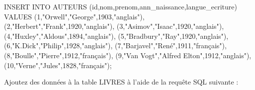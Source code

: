 \documentclass[
  a4paper,
  DIV=11,
  numbers=noendperiod]{scrartcl}
\newenvironment{Shaded}{\begin{snugshade}}{\end{snugshade}}
\newcommand{\DecValTok}[1]{\textcolor[rgb]{0.68,0.00,0.00}{#1}}
\newcommand{\KeywordTok}[1]{\textcolor[rgb]{0.00,0.23,0.31}{#1}}
\newcommand{\NormalTok}[1]{\textcolor[rgb]{0.00,0.23,0.31}{#1}}
\newcommand{\OtherTok}[1]{\textcolor[rgb]{0.00,0.23,0.31}{#1}}
\begin{document}
\begin{enumerate}
\begin{Shaded}
\begin{Highlighting}[]
\KeywordTok{INSERT} \KeywordTok{INTO}\NormalTok{ AUTEURS}
\NormalTok{(}\KeywordTok{id}\NormalTok{,nom,prenom,ann\_naissance,langue\_ecriture)}
\KeywordTok{VALUES}
\NormalTok{(}\DecValTok{1}\NormalTok{,}\OtherTok{"Orwell"}\NormalTok{,}\OtherTok{"George"}\NormalTok{,}\DecValTok{1903}\NormalTok{,}\OtherTok{"anglais"}\NormalTok{),}
\NormalTok{(}\DecValTok{2}\NormalTok{,}\OtherTok{"Herbert"}\NormalTok{,}\OtherTok{"Frank"}\NormalTok{,}\DecValTok{1920}\NormalTok{,}\OtherTok{"anglais"}\NormalTok{),}
\NormalTok{(}\DecValTok{3}\NormalTok{,}\OtherTok{"Asimov"}\NormalTok{,}\OtherTok{"Isaac"}\NormalTok{,}\DecValTok{1920}\NormalTok{,}\OtherTok{"anglais"}\NormalTok{),}
\NormalTok{(}\DecValTok{4}\NormalTok{,}\OtherTok{"Huxley"}\NormalTok{,}\OtherTok{"Aldous"}\NormalTok{,}\DecValTok{1894}\NormalTok{,}\OtherTok{"anglais"}\NormalTok{),}
\NormalTok{(}\DecValTok{5}\NormalTok{,}\OtherTok{"Bradbury"}\NormalTok{,}\OtherTok{"Ray"}\NormalTok{,}\DecValTok{1920}\NormalTok{,}\OtherTok{"anglais"}\NormalTok{),}
\NormalTok{(}\DecValTok{6}\NormalTok{,}\OtherTok{"K.Dick"}\NormalTok{,}\OtherTok{"Philip"}\NormalTok{,}\DecValTok{1928}\NormalTok{,}\OtherTok{"anglais"}\NormalTok{),}
\NormalTok{(}\DecValTok{7}\NormalTok{,}\OtherTok{"Barjavel"}\NormalTok{,}\OtherTok{"René"}\NormalTok{,}\DecValTok{1911}\NormalTok{,}\OtherTok{"français"}\NormalTok{),}
\NormalTok{(}\DecValTok{8}\NormalTok{,}\OtherTok{"Boulle"}\NormalTok{,}\OtherTok{"Pierre"}\NormalTok{,}\DecValTok{1912}\NormalTok{,}\OtherTok{"français"}\NormalTok{),}
\NormalTok{(}\DecValTok{9}\NormalTok{,}\OtherTok{"Van Vogt"}\NormalTok{,}\OtherTok{"Alfred Elton"}\NormalTok{,}\DecValTok{1912}\NormalTok{,}\OtherTok{"anglais"}\NormalTok{),}
\NormalTok{(}\DecValTok{10}\NormalTok{,}\OtherTok{"Verne"}\NormalTok{,}\OtherTok{"Jules"}\NormalTok{,}\DecValTok{1828}\NormalTok{,}\OtherTok{"français"}\NormalTok{);}
\end{Highlighting}
\end{Shaded}

  Ajoutez des données à la table LIVRES à l'aide de la requête SQL
  suivante :


\end{enumerate}
\end{document}
